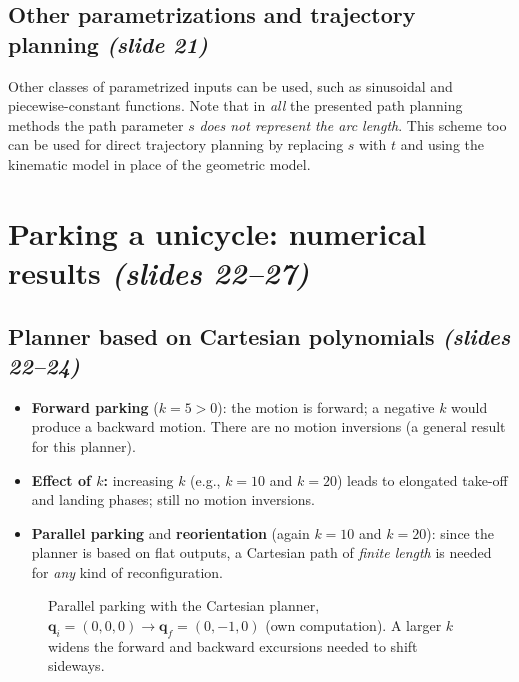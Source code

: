 \documentclass[11pt,a4paper]{article}
\newcommand{\qi}{\boldsymbol{q}_i}
\newcommand{\qf}{\boldsymbol{q}_f}
\theoremstyle{definition}
\theoremstyle{plain}
\theoremstyle{remark}
\begin{document}
\subsection{Other parametrizations and trajectory planning \emph{(slide 21)}}

Other classes of parametrized inputs can be used, such as sinusoidal and piecewise-constant functions. Note that in
\emph{all} the presented path planning methods the path parameter $s$ \emph{does not represent the arc length}. This scheme too can
be used for direct trajectory planning by replacing $s$ with $t$ and using the kinematic model in place of the geometric model.

\section{Parking a unicycle: numerical results \emph{(slides 22--27)}}

\subsection{Planner based on Cartesian polynomials \emph{(slides 22--24)}}

\begin{itemize}
\item \textbf{Forward parking} ($k=5>0$): the motion is forward; a negative $k$ would produce a backward motion. There are no motion inversions (a general result for this planner).
\item \textbf{Effect of $k$:} increasing $k$ (e.g., $k=10$ and $k=20$) leads to elongated take-off and landing phases; still no motion inversions.
\item \textbf{Parallel parking} and \textbf{reorientation} (again $k=10$ and $k=20$): since the planner is based on flat outputs, a Cartesian path of \emph{finite length} is needed for \emph{any} kind of reconfiguration.
\end{itemize}

\begin{figure}[H]
\centering
{}
\caption{Parallel parking with the Cartesian planner, $\qi=(0,0,0)\to\qf=(0,-1,0)$ (own computation). A larger $k$ widens the
forward and backward excursions needed to shift sideways.}
\end{figure}
\end{document}
